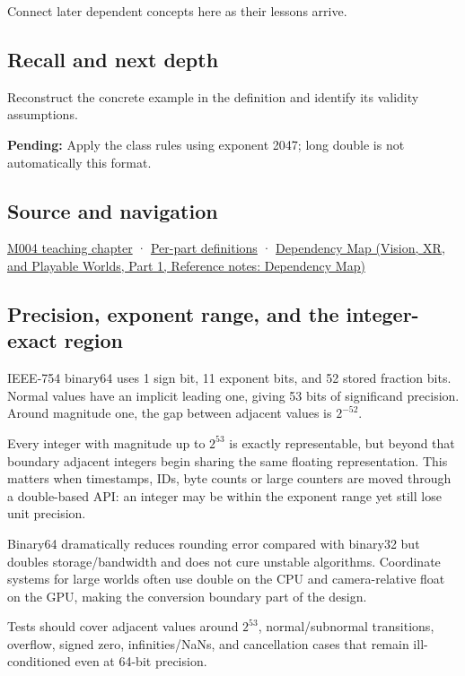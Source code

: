 Connect later dependent concepts here as their lessons arrive.

\subsection{Recall and next depth}\label{appendix-5078dfab64e6-recall-and-next-depth}

\hypertarget{appendix-5078dfab64e6-recall-and-next-depth}{}

Reconstruct the concrete example in the definition and identify its validity assumptions.

\textbf{Pending:} Apply the class rules using exponent 2047; long double is not automatically this format.

\subsection{Source and navigation}\label{appendix-5078dfab64e6-source-and-navigation}

\hypertarget{appendix-5078dfab64e6-source-and-navigation}{}

\hyperref[01-foundations-i-ch001-a-stretching-ruler-for-real-valued-quantities]{M004 teaching chapter} · \hyperref[appendix-fd090d982a15-m004---parts-61-76]{Per-part definitions} · \href{../07-Vision-XR-and-Playable-Worlds-P01/main.pdf\#appendix-4ad47bdd269a}{Dependency Map (Vision, XR, and Playable Worlds, Part 1, Reference notes: Dependency Map)}

\subsection{Precision, exponent range, and the integer-exact region}\label{appendix-5078dfab64e6-precision-exponent-range-and-the-integer-exact-region}

\hypertarget{appendix-5078dfab64e6-precision-exponent-range-and-the-integer-exact-region}{}

IEEE-754 binary64 uses 1 sign bit, 11 exponent bits, and 52 stored fraction bits. Normal values have an implicit leading one, giving 53 bits of significand precision. Around magnitude one, the gap between adjacent values is \(2^{-52}\).

Every integer with magnitude up to \(2^{53}\) is exactly representable, but beyond that boundary adjacent integers begin sharing the same floating representation. This matters when timestamps, IDs, byte counts or large counters are moved through a double-based API: an integer may be within the exponent range yet still lose unit precision.

Binary64 dramatically reduces rounding error compared with binary32 but doubles storage/bandwidth and does not cure unstable algorithms. Coordinate systems for large worlds often use double on the CPU and camera-relative float on the GPU, making the conversion boundary part of the design.

Tests should cover adjacent values around \(2^{53}\), normal/subnormal transitions, overflow, signed zero, infinities/NaNs, and cancellation cases that remain ill-conditioned even at 64-bit precision.
